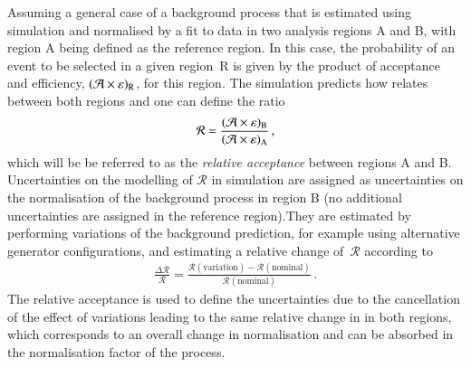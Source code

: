 Assuming a general case of a background process that is estimated
using simulation and normalised by a fit to data in two analysis
regions A and B, with region A being defined as the reference
region. In this case, the probability of an event to be selected in a
given region~R is given by the product of acceptance and efficiency,
$(\mathcal{A} \times \varepsilon)_{\text{R}}$, for this region. The simulation predicts
how \AccTimesEff relates between both regions and one can define the
ratio
\begin{align*}
  \mathcal{R} = \frac{(\mathcal{A} \times \varepsilon)_{\text{B}}}{(\mathcal{A} \times \varepsilon)_{\text{A}}} \,\text{,}
\end{align*}
which will be be referred to as the \emph{relative acceptance} between
regions A and B. Uncertainties on the modelling of $\mathcal{R}$ in
simulation are assigned as uncertainties on the normalisation of the
background process in region B (no
additional uncertainties are assigned in the reference region).They
are estimated by performing variations of the background prediction,
for example using alternative generator configurations, and estimating
a relative change of~$\mathcal{R}$ according to
\begin{align}
  \frac{\Delta \mathcal{R}}{\mathcal{R}} = \frac{\mathcal{R}(\text{variation}) - \mathcal{R}(\text{nominal})}{\mathcal{R}(\text{nominal})} \,\text{.}
  \label{eq:relative_acceptance_uncertainty}
\end{align}
The relative acceptance is used to define the uncertainties due to the
cancellation of the effect of variations leading to the same relative
change in \AccTimesEff in both regions, which corresponds to an
overall change in normalisation and can be absorbed in the
normalisation factor of the process.




